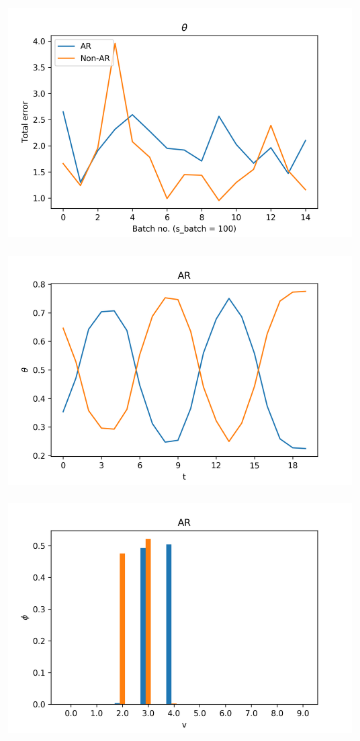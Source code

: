 \documentclass[12pt]{article}
\begin{document}
\begin{figure}[H]
  \centering
  \begin{subfigure}[b]{0.3\textwidth}
    \includegraphics[width=\linewidth]{performance_thetas_experiment-1|overlapping-yes_dataset-5.png}
  \end{subfigure}%
  \begin{subfigure}[b]{0.3\textwidth}
    \includegraphics[width=\linewidth]{latent_thetas_AR_experiment-1|overlapping-yes_dataset-5.png}
  \end{subfigure}%
  \begin{subfigure}[b]{0.3\textwidth}
    \includegraphics[width=\linewidth]{latent_phis_AR_experiment-1|overlapping-yes_dataset-5.png}
  \end{subfigure}%


\end{figure}
\end{document}
